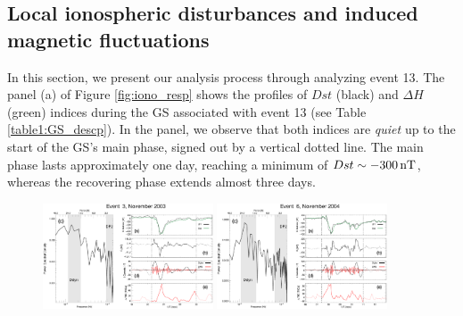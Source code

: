 \documentclass[a4paper,fleqn]{cas-dc}
\begin{document}
\subsection{Local ionospheric disturbances and induced magnetic fluctuations}
\label{analysis}
In this section, we present our analysis process through analyzing event 13. The panel (a) of Figure \ref{fig:iono_resp} shows the profiles of $Dst$ (black) and $\Delta H$ (green) indices during the GS associated with event 13 (see Table \ref{table1:GS_descp}). In the panel, we observe that both indices are \emph{quiet} up to the start of the GS's main phase, signed out by a vertical dotted line. The main phase lasts approximately one day, reaching a minimum of $Dst \sim -300\,{\rm nT}$, whereas the recovering phase extends almost three days.  

\begin{figure}[h!]
	\centering
	\centerline{\Large \bf   
		\hfill}
	\centerline{\Large \bf   
		\hspace{0.26\textwidth}  \color{black}{}
		\hspace{0.31\textwidth}  \color{black}{}
		\hfill}
	\includegraphics[width=0.45\textwidth]{images/diono/iono_PI_2003-11-19.eps}
	\includegraphics[width=0.45\textwidth]{images/diono/iono_PI_2004-11-06.eps}


\end{figure}
\end{document}
